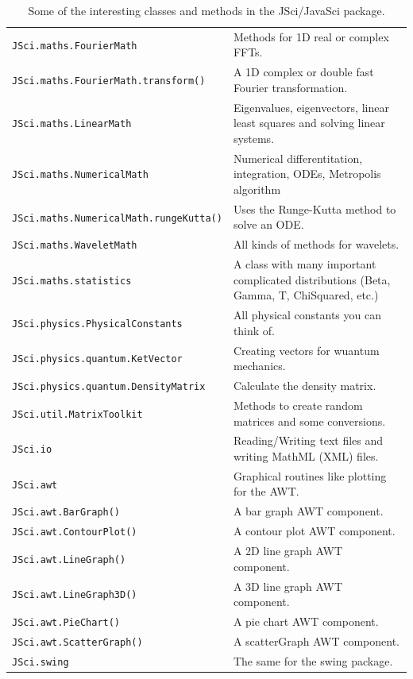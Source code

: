 \begin{table}
\begin{center}
\begin{tabular}{ll}
\verb|JSci.maths.FourierMath| & Methods for 1D real or complex FFTs.\\
\verb|JSci.maths.FourierMath.transform()| & A 1D complex or double fast 
        Fourier transformation.\\\hline
\verb|JSci.maths.LinearMath| & Eigenvalues, eigenvectors, linear least squares
           and solving linear systems.\\\hline
\verb|JSci.maths.NumericalMath| &  Numerical differentitation, integration, 
        ODEs, Metropolis algorithm \\
\verb|JSci.maths.NumericalMath.rungeKutta()| & Uses the Runge-Kutta 
              method to solve an ODE.\\\hline
\verb|JSci.maths.WaveletMath| & All kinds of methods for wavelets.\\\hline
\verb|JSci.maths.statistics| & A class with many important complicated 
              distributions (Beta, Gamma, T, ChiSquared, etc.)\\\hline
\verb|JSci.physics.PhysicalConstants| & All physical constants you 
                               can think of.\\\hline
\verb|JSci.physics.quantum.KetVector| & Creating vectors for wuantum 
             mechanics.\\
\verb|JSci.physics.quantum.DensityMatrix| & Calculate the density matrix.\\\hline
\verb|JSci.util.MatrixToolkit| & Methods to create random matrices 
                 and some conversions.\\\hline
\verb|JSci.io| & Reading/Writing text files and writing MathML (XML) files.\\\hline
\verb|JSci.awt| & Graphical routines like plotting for the AWT.\\
\verb|JSci.awt.BarGraph()| & A bar graph AWT component. \\
\verb|JSci.awt.ContourPlot()| & A contour plot AWT component. \\
\verb|JSci.awt.LineGraph()| & A 2D line graph AWT component. \\
\verb|JSci.awt.LineGraph3D()| & A 3D line graph AWT component. \\
\verb|JSci.awt.PieChart()| & A pie chart AWT component. \\
\verb|JSci.awt.ScatterGraph()| & A scatterGraph AWT component. \\\hline
\verb|JSci.swing| & The same for the swing package.\\
     \end{tabular}
    \caption{Some of the interesting classes and methods in 
      the JSci/JavaSci package.}
    \label{tab:JSciClasses}
  \end{center}
\end{table}
